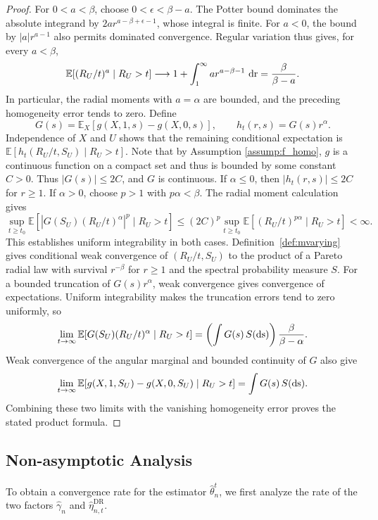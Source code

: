 \documentclass[12pt]{article}
\theoremstyle{plain}
\theoremstyle{definition}
\begin{document}
\begin{proof}
For $0<a<\beta$, choose $0<\epsilon<\beta-a$. The Potter bound dominates the absolute integrand by $2a r^{a-\beta+\epsilon-1}$, whose integral is finite. For $a<0$, the bound by $|a|r^{a-1}$ also permits dominated convergence. Regular variation thus gives, for every $a<\beta$, 
\[
\mathbb E[(R_U/t)^a\mid R_U>t]\longrightarrow1+\int_1^{\infty}a r^{a-\beta-1}\,\operatorname{dr}=\frac{\beta}{\beta-a}.
\]
 In particular, the radial moments with $a=\alpha$ are bounded, and the preceding homogeneity error tends to zero. Define 
\[
G(s)=\mathbb E_X[g(X,1,s)-g(X,0,s)],\qquad h_t(r,s)=G(s)r^{\alpha}.
\]
 Independence of $X$ and $U$ shows that the remaining conditional expectation is $\mathbb E[h_t(R_U/t,S_U)\mid R_U>t]$.
Note that by Assumption \ref{assump:f_homo}, $g$ is a continuous function on a
compact set and thus is bounded by some constant $C > 0$. Thus $|G(s)|\leq2C$, and $G$ is continuous. If $\alpha\leq0$, then $|h_t(r,s)|\leq2C$ for $r\geq1$. If $\alpha>0$, choose $p>1$ with $p\alpha<\beta$. The radial moment calculation gives 
\[
\sup_{t\geq t_0}\mathbb E[|G(S_U)(R_U/t)^{\alpha}|^p\mid R_U>t]\leq(2C)^p\sup_{t\geq t_0}\mathbb E[(R_U/t)^{p\alpha}\mid R_U>t]<\infty.
\]
 This establishes uniform integrability in both cases. Definition~\ref{def:mvarying} gives conditional weak convergence of $(R_U/t,S_U)$ to the product of a Pareto radial law with survival $r^{-\beta}$ for $r\geq1$ and the spectral probability measure $S$. For a bounded truncation of $G(s)r^{\alpha}$, weak convergence gives convergence of expectations. Uniform integrability makes the truncation errors tend to zero uniformly, so 
\[
\lim_{t\rightarrow\infty}\mathbb E[G(S_U)(R_U/t)^{\alpha}\mid R_U>t]=\left(\int G(s)\,S(\operatorname{ds})\right)\frac{\beta}{\beta-\alpha}.
\]
 Weak convergence of the angular marginal and bounded continuity of $G$ also give 
\[
\lim_{t\rightarrow\infty}\mathbb E[g(X,1,S_U)-g(X,0,S_U)\mid R_U>t]=\int G(s)\,S(\operatorname{ds}).
\]
 Combining these two limits with the vanishing homogeneity error proves the stated product formula.
\end{proof}

\subsection{Non-asymptotic Analysis}

To obtain a convergence rate for the estimator $\hat{\theta}_n^t$, we first analyze the rate of the two factors $\hat{\gamma}_n$ and $\hat{\eta}_{n,t}^{\text{DR}}$.
\end{document}
